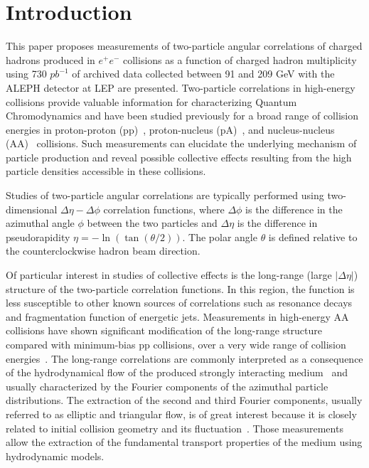 \section{Introduction}

This paper proposes measurements of two-particle angular correlations of charged hadrons produced in $e^+e^-$ collisions as a function of charged hadron multiplicity using 730 $pb^{-1}$ of archived data collected between 91 and 209 GeV with the ALEPH detector at LEP are presented.  Two-particle correlations in high-energy collisions provide valuable information for characterizing Quantum Chromodynamics and have been studied previously for a broad range of collision energies in proton-proton (pp)~\cite{Khachatryan:2010gv}, proton-nucleus (pA)~\cite{CMS:2012qk,Abelev:2012ola,Aad:2012gla}, and nucleus-nucleus (AA)~\cite{Aamodt:2010pa,Chatrchyan:2012wg} collisions. Such measurements can elucidate the underlying mechanism of particle production and reveal possible collective effects resulting from the high particle densities accessible in these collisions.

Studies of two-particle angular correlations are typically performed using two-dimensional $\Delta\eta-\Delta\phi$ correlation functions, where $\Delta\phi$ is the difference in the azimuthal angle $\phi$ between the two particles and $\Delta\eta$ is the difference in pseudorapidity $\eta = -\ln(\tan(\theta/2))$. The polar angle $\theta$ is defined relative to the counterclockwise hadron beam direction.

Of particular interest in studies of collective effects is the long-range (large $|\Delta\eta|$) structure of the two-particle correlation functions. In this region, the function is less susceptible to other known sources of correlations such as resonance decays and fragmentation function of energetic jets. Measurements in high-energy AA collisions have shown significant modification of the long-range structure compared with minimum-bias pp collisions, over a very wide range of collision energies~\cite{Back:2004je,Arsene:2004fa,Adcox:2004mh,Adams:2005dq}. The long-range correlations are commonly interpreted as a consequence of the hydrodynamical flow of the produced strongly interacting medium~\cite{Ollitrault:1992bk} and usually characterized by the Fourier components of the azimuthal particle distributions. The extraction of the second and third Fourier components, usually referred to as elliptic and triangular flow, is of great interest because it is closely related to initial collision geometry and its fluctuation~\cite{Alver:2010gr}. Those measurements allow the extraction of the fundamental transport properties of the medium using hydrodynamic models.

